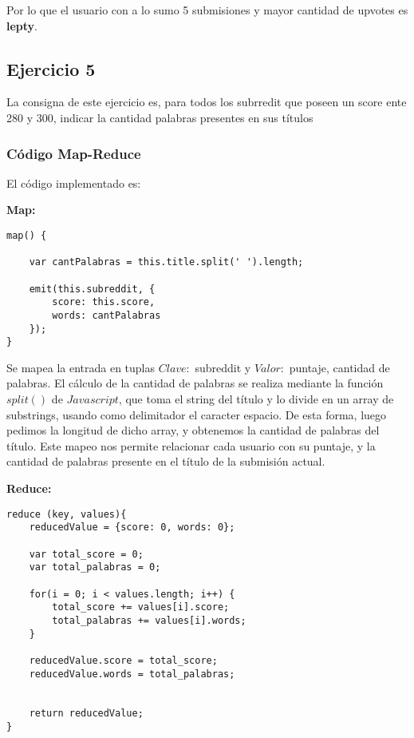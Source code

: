 Por lo que el usuario con a lo sumo 5 submisiones y mayor cantidad de upvotes es \textbf{lepty}.

\subsection{Ejercicio 5}

La consigna de este ejercicio es, para todos los subrredit que poseen un score ente 280 y 300, indicar la cantidad palabras
presentes en sus títulos

\subsubsection{C\'odigo Map-Reduce}

El c\'odigo implementado es:

\textbf{Map:}

\begin{lstlisting}
map() {

	var cantPalabras = this.title.split(' ').length;

    emit(this.subreddit, {
    	score: this.score,
    	words: cantPalabras
    });
}

\end{lstlisting}

Se mapea la entrada en tuplas $Clave:$ subreddit y $Valor:$ puntaje, cantidad de palabras. El c\'alculo de la cantidad de palabras se realiza mediante la funci\'on $split()$ de $Javascript$, que toma el string del t\'itulo y lo divide en un array de substrings, usando como delimitador el caracter espacio. De esta forma, luego pedimos la longitud de dicho array, y obtenemos la cantidad de palabras del t\'itulo. Este mapeo nos permite relacionar cada usuario con su puntaje, y la cantidad de palabras presente en el t\'itulo de la submisi\'on actual.

\vspace{2mm}

\textbf{Reduce:}

\begin{lstlisting}
reduce (key, values){
    reducedValue = {score: 0, words: 0};

	var total_score = 0;
	var total_palabras = 0;

	for(i = 0; i < values.length; i++) {
		total_score += values[i].score;
		total_palabras += values[i].words;
	}

	reducedValue.score = total_score;
	reducedValue.words = total_palabras;


    return reducedValue;
}

\end{lstlisting}

